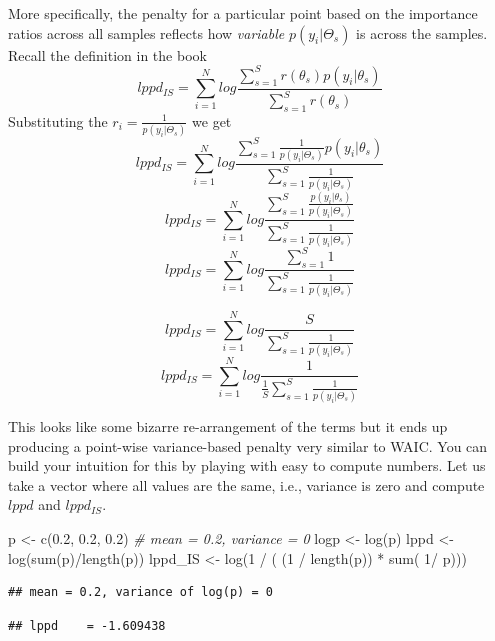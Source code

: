 \documentclass[
]{book}
\newenvironment{Shaded}{\begin{snugshade}}{\end{snugshade}}
\newcommand{\CommentTok}[1]{\textcolor[rgb]{0.56,0.35,0.01}{\textit{#1}}}
\newcommand{\DecValTok}[1]{\textcolor[rgb]{0.00,0.00,0.81}{#1}}
\newcommand{\FloatTok}[1]{\textcolor[rgb]{0.00,0.00,0.81}{#1}}
\newcommand{\FunctionTok}[1]{\textcolor[rgb]{0.00,0.00,0.00}{#1}}
\newcommand{\NormalTok}[1]{#1}
\newcommand{\OtherTok}[1]{\textcolor[rgb]{0.56,0.35,0.01}{#1}}
\newcommand{\SpecialCharTok}[1]{\textcolor[rgb]{0.00,0.00,0.00}{#1}}
\begin{document}
More specifically, the penalty for a particular point based on the importance ratios across all samples reflects how \emph{variable} \(p(y_i|\Theta_s)\) is across the samples. Recall the definition in the book
\[lppd_{IS} = \sum^N_{i=1} log \frac{\sum^S_{s=1}r(\theta_s)p(y_i|\theta_s)}{\sum^S_{s=1}r(\theta_s)}\]
Substituting the \(r_i = \frac{1}{p(y_i|\Theta_s)}\) we get
\[lppd_{IS} = \sum^N_{i=1} log \frac{\sum^S_{s=1}\frac{1}{p(y_i|\Theta_s)}p(y_i|\theta_s)}{\sum^S_{s=1}\frac{1}{p(y_i|\Theta_s)}}\]
\[lppd_{IS} = \sum^N_{i=1} log \frac{\sum^S_{s=1}\frac{p(y_i|\theta_s)}{p(y_i|\Theta_s)}}{\sum^S_{s=1}\frac{1}{p(y_i|\Theta_s)}}\]
\[lppd_{IS} = \sum^N_{i=1} log \frac{\sum^S_{s=1}1}{\sum^S_{s=1}\frac{1}{p(y_i|\Theta_s)}}\]

\[lppd_{IS} = \sum^N_{i=1} log \frac{S}{\sum^S_{s=1}\frac{1}{p(y_i|\Theta_s)}}\]
\[lppd_{IS} = \sum^N_{i=1} log \frac{1}{\frac{1}{S}\sum^S_{s=1}\frac{1}{p(y_i|\Theta_s)}}\]

This looks like some bizarre re-arrangement of the terms but it ends up producing a point-wise variance-based penalty very similar to WAIC. You can build your intuition for this by playing with easy to compute numbers. Let us take a vector where all values are the same, i.e., variance is zero and compute \(lppd\) and \(lppd_{IS}\).

\begin{Shaded}
\begin{Highlighting}[]
\NormalTok{p }\OtherTok{\textless{}{-}} \FunctionTok{c}\NormalTok{(}\FloatTok{0.2}\NormalTok{, }\FloatTok{0.2}\NormalTok{, }\FloatTok{0.2}\NormalTok{) }\CommentTok{\# mean = 0.2, variance = 0}
\NormalTok{logp }\OtherTok{\textless{}{-}} \FunctionTok{log}\NormalTok{(p)}
\NormalTok{lppd }\OtherTok{\textless{}{-}} \FunctionTok{log}\NormalTok{(}\FunctionTok{sum}\NormalTok{(p)}\SpecialCharTok{/}\FunctionTok{length}\NormalTok{(p))}
\NormalTok{lppd\_IS }\OtherTok{\textless{}{-}} \FunctionTok{log}\NormalTok{(}\DecValTok{1} \SpecialCharTok{/}\NormalTok{ ( (}\DecValTok{1} \SpecialCharTok{/} \FunctionTok{length}\NormalTok{(p)) }\SpecialCharTok{*} \FunctionTok{sum}\NormalTok{( }\DecValTok{1}\SpecialCharTok{/}\NormalTok{ p)))}
\end{Highlighting}
\end{Shaded}

\begin{verbatim}
## mean = 0.2, variance of log(p) = 0
\end{verbatim}

\begin{verbatim}
## lppd    = -1.609438
\end{verbatim}
\end{document}
